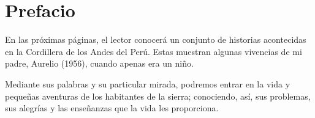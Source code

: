 \cleardoublepage
\newpage
\thispagestyle{empty}
\vfill


\chapter*{Prefacio} %

En las próximas páginas, el lector conocerá un conjunto de historias acontecidas en la Cordillera de los Andes del Perú. 
Estas muestran algunas vivencias de mi padre, Aurelio (1956), cuando apenas era un niño. %

Mediante sus palabras y su particular mirada, podremos entrar en la vida y pequeñas aventuras de los habitantes de la sierra; conociendo, así, sus problemas, sus alegrías y las enseñanzas que la vida les proporciona.
\vfill

\newpage
\thispagestyle{empty}
